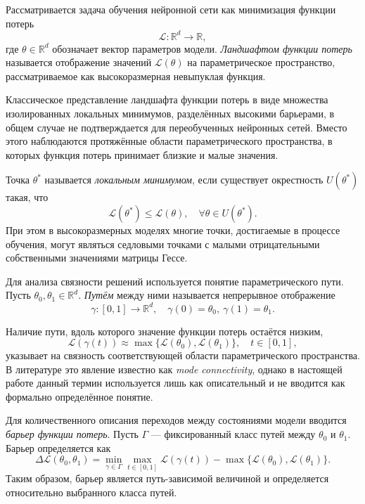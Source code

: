Рассматривается задача обучения нейронной сети как минимизация функции потерь
\begin{equation}
\mathcal{L} : \mathbb{R}^d \to \mathbb{R},
\end{equation}
где $\theta \in \mathbb{R}^d$ обозначает вектор параметров модели. 
\emph{Ландшафтом функции потерь} называется отображение значений $\mathcal{L}(\theta)$ на параметрическое пространство, рассматриваемое как высокоразмерная невыпуклая функция.

Классическое представление ландшафта функции потерь в виде множества изолированных локальных минимумов, разделённых высокими барьерами, в общем случае не подтверждается для переобученных нейронных сетей. Вместо этого наблюдаются протяжённые области параметрического пространства, в которых функция потерь принимает близкие и малые значения.

Точка $\theta^\ast$ называется \emph{локальным минимумом}, если существует окрестность $U(\theta^\ast)$ такая, что
\begin{equation}
\mathcal{L}(\theta^\ast) \le \mathcal{L}(\theta), \quad \forall \theta \in U(\theta^\ast).
\end{equation}
При этом в высокоразмерных моделях многие точки, достигаемые в процессе обучения, могут являться седловыми точками с малыми отрицательными собственными значениями матрицы Гессе.

Для анализа связности решений используется понятие параметрического пути. 
Пусть $\theta_0, \theta_1 \in \mathbb{R}^d$. 
\emph{Путём} между ними называется непрерывное отображение
\begin{equation}
\gamma : [0,1] \to \mathbb{R}^d,
\quad
\gamma(0) = \theta_0, \ \gamma(1) = \theta_1.
\end{equation}

Наличие пути, вдоль которого значение функции потерь остаётся низким,
\begin{equation}
\mathcal{L}(\gamma(t)) \approx \max\{\mathcal{L}(\theta_0), \mathcal{L}(\theta_1)\},
\quad t \in [0,1],
\end{equation}
указывает на связность соответствующей области параметрического пространства. В литературе это явление известно как \emph{mode connectivity}, однако в настоящей работе данный термин используется лишь как описательный и не вводится как формально определённое понятие.

Для количественного описания переходов между состояниями модели вводится \emph{барьер функции потерь}. 
Пусть $\Gamma$ — фиксированный класс путей между $\theta_0$ и $\theta_1$. 
Барьер определяется как
\begin{equation}
\Delta \mathcal{L}(\theta_0, \theta_1)
=
\min_{\gamma \in \Gamma}
\max_{t \in [0,1]}
\mathcal{L}(\gamma(t))
-
\max\{\mathcal{L}(\theta_0), \mathcal{L}(\theta_1)\}.
\end{equation}
Таким образом, барьер является путь-зависимой величиной и определяется относительно выбранного класса путей.


